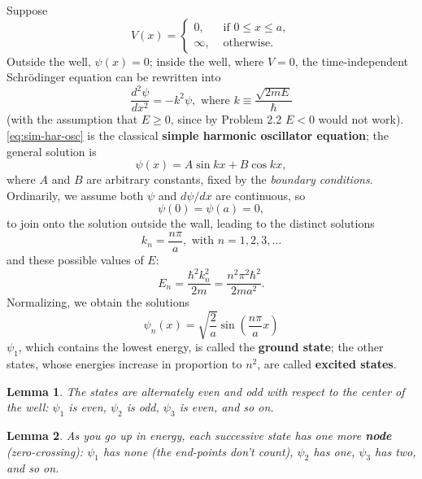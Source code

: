 \documentclass{article}
\newtheorem*{lemma*}{Lemma}
\begin{document}
Suppose
\begin{equation} \label{eq:inf-sq-well}
  V(x) =
  \begin{cases}
    0, &\text{ if } 0 \leq x \leq a, \\
    \infty, &\text{ otherwise}.
  \end{cases}
\end{equation}
Outside the well, $\psi(x) = 0$; inside the well, where $V = 0$, the
time-independent Schr\"{o}dinger equation can be rewritten into
\begin{equation} \label{eq:sim-har-osc}
  \frac{d^2\psi}{dx^2} = -k^2\psi,
  \text{ where } k \equiv \frac{\sqrt{2mE}}{\hbar}
\end{equation}
(with the assumption that $E \geq 0$, since by Problem 2.2 $E < 0$ would not
work). \eqref{eq:sim-har-osc} is the classical \textbf{simple harmonic
oscillator equation}; the general solution is
\begin{equation} \label{eq:sim-har-osc-1}
  \psi(x) = A \sin kx + B \cos kx,
\end{equation}
where $A$ and $B$ are arbitrary constants, fixed by the \emph{boundary
conditions}. Ordinarily, we assume both $\psi$ and $d\psi/dx$ are continuous,
so \[
  \psi(0) = \psi(a) = 0,
\] to join onto the solution outside the wall, leading to the distinct
solutions
\begin{equation} \label{eq:sim-har-osc-2}
  k_n = \frac{n\pi}{a}, \text{ with } n = 1, 2, 3, \ldots
\end{equation}
and these possible values of $E$:
\begin{equation} \label{eq:sim-har-osc-ene}
  \boxed{
    E_n = \frac{\hbar^2k_n^2}{2m} = \frac{n^2\pi^2\hbar^2}{2ma^2}.
  }
\end{equation}
Normalizing, we obtain the solutions
\begin{equation} \label{eq:sim-har-osc-psi}
  \boxed{
    \psi_n(x) = \sqrt{\frac{2}{a}} \sin\left(\frac{n\pi}{a}x\right)
  }
\end{equation}
$\psi_1$, which contains the lowest energy, is called the \textbf{ground
state}; the other states, whose energies increase in proportion to $n^2$, are
called \textbf{excited states}.

\begin{lemma*}
  The states are alternately \emph{even} and \emph{odd} with respect to the
  center of the well: $\psi_1$ is even, $\psi_2$ is odd, $\psi_3$ is even, and
  so on.
\end{lemma*}

\begin{lemma*}
  As you go up in energy, each successive state has one more \textbf{node}
  (zero-crossing): $\psi_1$ has none (the end-points don't count), $\psi_2$ has
  one, $\psi_3$ has two, and so on.
\end{lemma*}
\end{document}
